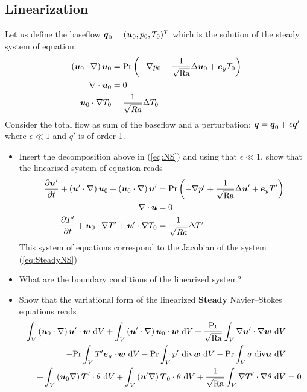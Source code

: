 \documentclass[12pt,a4paper]{scrartcl}
\renewcommand{\vec}[1]{{\mbox{\boldmath $ #1 $}}}
\newcommand{\dd}{\textrm{d}}
\def\Pran{\mbox{Pr}}  %
\def\Ra{\mbox{Ra}}    %
\begin{document}
\subsection{Linearization}
Let us define the baseflow $\vec q_0 = (\vec u_0 , p_0, T_0)^T$ which is the solution of the steady system of equation:
\begin{align}\label{eq:SteadyNS}
\left( \vec u_0\cdot \nabla \right)\vec u_0 &= \Pran \left(-\nabla p_0 + \frac{1}{\sqrt{\Ra}}\Delta \vec u_0 + \vec e_y  T_0\right) \\
\nabla \cdot \vec u_0 &= 0 \nonumber \\
 \vec u_0 \cdot \nabla T_0 &= \frac{1}{\sqrt{Ra}} \Delta T_0 \nonumber
\end{align}
Consider the total flow as sum of the baseflow and a perturbation: $\vec q = \vec q_0 + \epsilon\vec q'$ where $\epsilon \ll 1$  and $q'$ is of order 1.

\begin{itemize}
\item Insert the decomposition above in (\ref{eq:NS}) and using that $\epsilon \ll 1$, show that the linearised system of equation reads
\begin{align}\label{eq:LNS}
\frac{\partial  \vec u'}{\partial t} + \left( \vec u'\cdot \nabla \right)\vec u_0 + \left( \vec u_0\cdot \nabla \right)\vec u' &= \Pran \left(-\nabla p' + \frac{1}{\sqrt{\Ra}}\Delta \vec u' + \vec e_y  T'\right) \\
\nabla \cdot \vec u &= 0 \nonumber \\
\frac{\partial T'}{\partial t}  + \vec u_0 \cdot \nabla T' + \vec u' \cdot \nabla T_0 &= \frac{1}{\sqrt{Ra}} \Delta T' \nonumber
\end{align}
This system of equations correspond to the Jacobian of the system (\ref{eq:SteadyNS})
\item What are the boundary conditions of the linearized system? 
\item Show that the variational form of the linearized \textbf{Steady }Navier--Stokes equations reads
\begin{align}\label{eq:LNS_varf}
\int_V    \left(\vec u_0 \cdot \nabla  \right)\vec u'  \cdot \vec w   \ \dd V + \int_V \left(\vec u' \cdot \nabla  \right)\vec u_0 \cdot \vec w \ \dd V  + \frac{\Pran }{\sqrt{\Ra}}\int_V \nabla \vec u' \cdot \nabla \vec w \ \dd V & \\
 - \Pran \int_V T' \vec e_y \cdot \vec w \ \dd V - \Pran \int_V  p' \ \mathrm{div} \vec w \ \dd V  - \Pran \int_V  q \ \mathrm{div} \vec u \ \dd V & \nonumber\\
+ \int_V \left(\vec u_0 \nabla  \right)\vec T'  \cdot \theta   \ \dd V + \int_V \left(\vec u'  \nabla  \right)\vec T_0 \cdot \theta \ \dd V +\frac{1}{\sqrt{\Ra}} \int_V \nabla \vec T' \cdot \nabla \theta \ \dd V & = 0 \nonumber
\end{align}

\end{itemize}
\end{document}
